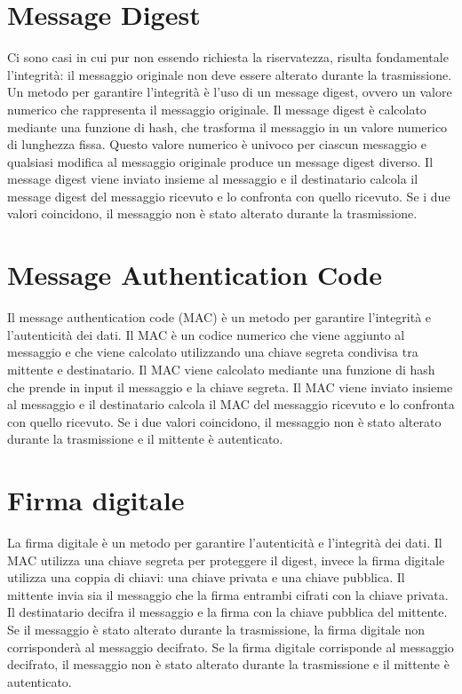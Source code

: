 \documentclass[12pt]{report}
\begin{document}
\section{Message Digest}
Ci sono casi in cui pur non essendo richiesta la riservatezza, risulta fondamentale l'integrità: il messaggio originale non deve essere alterato durante la trasmissione. Un metodo per garantire l'integrità è l'uso di un message digest, ovvero un valore numerico che rappresenta il messaggio originale. Il message digest è calcolato mediante una funzione di hash, che trasforma il messaggio in un valore numerico di lunghezza fissa. Questo valore numerico è univoco per ciascun messaggio e qualsiasi modifica al messaggio originale produce un message digest diverso. Il message digest viene inviato insieme al messaggio e il destinatario calcola il message digest del messaggio ricevuto e lo confronta con quello ricevuto. Se i due valori coincidono, il messaggio non è stato alterato durante la trasmissione. 

\section{Message Authentication Code}
Il message authentication code (MAC) è un metodo per garantire l'integrità e l'autenticità dei dati. Il MAC è un codice numerico che viene aggiunto al messaggio e che viene calcolato utilizzando una chiave segreta condivisa tra mittente e destinatario. Il MAC viene calcolato mediante una funzione di hash che prende in input il messaggio e la chiave segreta. Il MAC viene inviato insieme al messaggio e il destinatario calcola il MAC del messaggio ricevuto e lo confronta con quello ricevuto. Se i due valori coincidono, il messaggio non è stato alterato durante la trasmissione e il mittente è autenticato.

\section{Firma digitale}
La firma digitale è un metodo per garantire l'autenticità e l'integrità dei dati. Il MAC utilizza una chiave segreta per proteggere il digest, invece la firma digitale utilizza una coppia di chiavi: una chiave privata e una chiave pubblica. Il mittente invia sia il messaggio che la firma entrambi cifrati con la chiave privata. Il destinatario decifra il messaggio e la firma con la chiave pubblica del mittente. Se il messaggio è stato alterato durante la trasmissione, la firma digitale non corrisponderà al messaggio decifrato. Se la firma digitale corrisponde al messaggio decifrato, il messaggio non è stato alterato durante la trasmissione e il mittente è autenticato.
\end{document}
